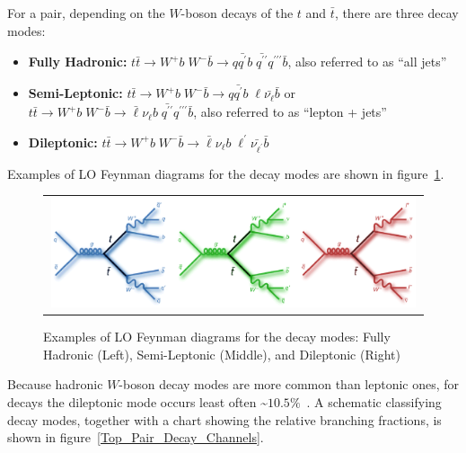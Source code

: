 \begin{refsection}
For a \ttbar pair, depending on the $W$-boson decays of the $t$ and $\bar{t}$, there are three decay modes: 
\begin{itemize}
    \item {\bf Fully Hadronic:} $t\bar{t} \rightarrow W^+ b \; W^- \bar{b} \rightarrow q \bar{q^\prime} b \; \bar{q^{\prime\prime}}  q^{\prime\prime\prime} \bar{b}$, also referred to as ``all jets''
    \item {\bf Semi-Leptonic:} $t\bar{t} \rightarrow W^+ b \; W^- \bar{b} \rightarrow  q \bar{q^\prime} b \; \ell \bar{\nu_{\ell}} \bar{b} $ or $t\bar{t} \rightarrow W^+ b \; W^- \bar{b} \rightarrow  \bar{\ell} \nu_\ell b \; \bar{q^{\prime\prime}}  q^{\prime\prime\prime} \bar{b}$, also referred to as ``lepton + jets''
    \item {\bf Dileptonic:} $t\bar{t} \rightarrow W^+ b \; W^- \bar{b} \rightarrow \bar{\ell} \nu_\ell b \; \ell^{\prime} \bar{\nu_{\ell^{\prime}}} \bar{b}$
\end{itemize}
Examples of LO Feynman diagrams for the \ttbar decay modes are shown in figure~\ref{Top_Pair_Decay_FeynmanDiagrams}.
\begin{figure}[htb]
  \begin{center}
    \begin{tabular}{c}
        \includegraphics[width=0.99\textwidth]{fig_TopQuark/ttbar_decay_feynman_diagrams.png}
    \end{tabular}
    \caption{Examples of LO Feynman diagrams for the \ttbar decay modes: Fully Hadronic (Left), Semi-Leptonic (Middle), and Dileptonic (Right)~\cite{d0_diagrams}
            }
    \label{Top_Pair_Decay_FeynmanDiagrams}
  \end{center}
\end{figure}
Because hadronic $W$-boson decay modes are more common than leptonic ones, for \ttbar decays the dileptonic mode occurs least often \sim$10.5 \%$~\cite{bib:PDG}.
A schematic classifying \ttbar decay modes, together with a chart showing the relative branching fractions, is shown in figure~\ref{Top_Pair_Decay_Channels}.
\begin{figure}[htb]
  \begin{center}

\end{center}
\end{figure}
\end{refsection}
